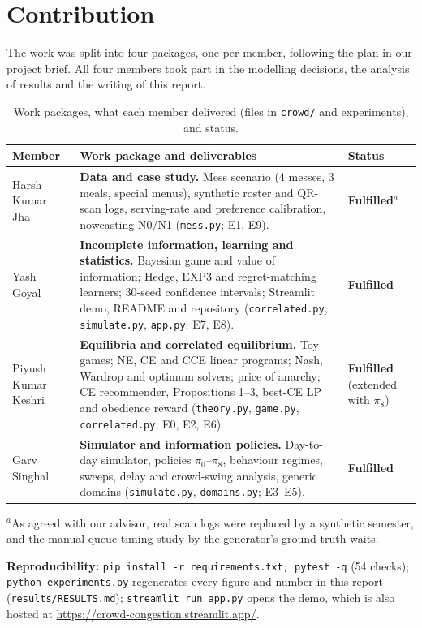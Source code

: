 \documentclass{article}
\begin{document}
\section{Contribution}
The work was split into four packages, one per member, following the plan in our project brief. All four members
took part in the modelling decisions, the analysis of results and the writing of this report.
\begin{table}[H]\centering\small
\caption{Work packages, what each member delivered (files in \texttt{crowd/} and experiments), and status.}\label{tab:contrib}
\begin{tabular}{>{\raggedright\arraybackslash}p{2.3cm}>{\raggedright\arraybackslash}p{10.6cm}>{\raggedright\arraybackslash}p{2.3cm}}\toprule
Member & Work package and deliverables & Status\\\midrule
Harsh Kumar Jha & \textbf{Data and case study.} Mess scenario (4 messes, 3 meals, special menus), synthetic roster
and QR-scan logs, serving-rate and preference calibration, nowcasting N0/N1 (\texttt{mess.py}; E1, E9). &
\textbf{Fulfilled}$^{a}$\\
Yash Goyal & \textbf{Incomplete information, learning and statistics.} Bayesian game and value of information;
Hedge, EXP3 and regret-matching learners; 30-seed confidence intervals; Streamlit demo, README and repository
(\texttt{correlated.py}, \texttt{simulate.py}, \texttt{app.py}; E7, E8). & \textbf{Fulfilled}\\
Piyush Kumar Keshri & \textbf{Equilibria and correlated equilibrium.} Toy games; NE, CE and CCE linear programs;
Nash, Wardrop and optimum solvers; price of anarchy; CE recommender, Propositions 1--3, best-CE LP and obedience
reward (\texttt{theory.py}, \texttt{game.py}, \texttt{correlated.py}; E0, E2, E6). & \textbf{Fulfilled} (extended with $\pi_8$)\\
Garv Singhal & \textbf{Simulator and information policies.} Day-to-day simulator, policies $\pi_0$--$\pi_8$, behaviour
regimes, sweeps, delay and crowd-swing analysis, generic domains (\texttt{simulate.py}, \texttt{domains.py};
E3--E5). & \textbf{Fulfilled}\\\bottomrule
\end{tabular}

\vspace{2pt}\raggedright\footnotesize $^{a}$As agreed with our advisor, real scan logs were replaced by a synthetic
semester, and the manual queue-timing study by the generator's ground-truth waits.
\end{table}
{\sloppy\noindent\textbf{Reproducibility:}
\texttt{pip install -r requirements.txt; pytest -q} (54 checks); \texttt{python experiments.py} regenerates every
figure and number in this report (\texttt{results/RESULTS.md}); \texttt{streamlit run app.py} opens the demo, which is also hosted at \url{https://crowd-congestion.streamlit.app/}.\par}
\end{document}
